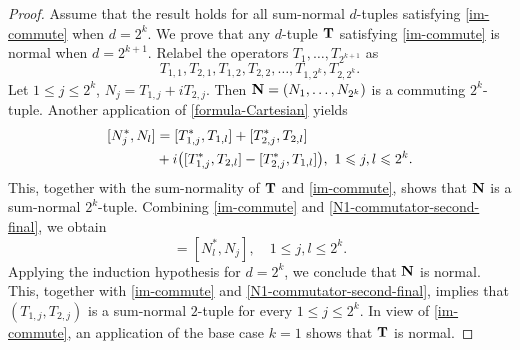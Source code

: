 \documentclass[10pt, a4paper, oneside, reqno]{amsproc}
\numberwithin{equation}{section}
\theoremstyle{remark}
\theoremstyle{definition}
\newcommand*{\Le}{\leqslant}
\begin{document}
\begin{proof}
Assume that the result holds for all sum-normal $d$-tuples satisfying \eqref{im-commute} when $d=2^k$. We prove that any $d$-tuple ${\bf T}$ satisfying \eqref{im-commute} is normal when $d=2^{k+1}$. Relabel the operators $T_1, \ldots, T_{2^{k+1}}$ as $$T_{1,1}, T_{2,1}, T_{1,2}, T_{2,2}, \ldots, T_{1,2^{k}}, T_{2,2^{k}}.$$
Let $1 \Le j \Le 2^{k}$, $N_j=T_{1,j}+iT_{2,j}$. Then
${\bf N}=(N_1, \ldots, N_{2^{k}})$ is a commuting $2^k$-tuple. 
Another application of \eqref{formula-Cartesian} yields
\begin{align} 
\notag
[N_j^*,N_l]
&=[T_{1,j}^*,T_{1,l}]
+[T_{2,j}^*,T_{2,l}] \\ \label{N1-commutator-second-final}
&+i\big([T_{1,j}^*,T_{2,l}]
-[T_{2,j}^*,T_{1,l}]\big), ~ 1 \Le j, l \Le 2^{k}.
\end{align}
This, together with the sum-normality of ${\bf T}$ and \eqref{im-commute}, shows that ${\bf N}$ is a sum-normal $2^{k}$-tuple. 
Combining \eqref{im-commute} and \eqref{N1-commutator-second-final}, we obtain
\begin{equation*} 
[N^*_j, N_l]=[N^*_l, N_j], \quad 1 \Le j, l \Le 2^{k}. 
\end{equation*}
Applying the induction hypothesis for $d=2^{k}$, we conclude that ${\bf N}$ is normal. This, together with \eqref{im-commute} and \eqref{N1-commutator-second-final}, implies that $(T_{1,j}, T_{2,j})$ is a sum-normal $2$-tuple for every $1 \Le j \Le 2^k$. In view of \eqref{im-commute}, an application of the base case $k=1$ shows that 
${\bf T}$ is normal.
\end{proof}
\end{document}
